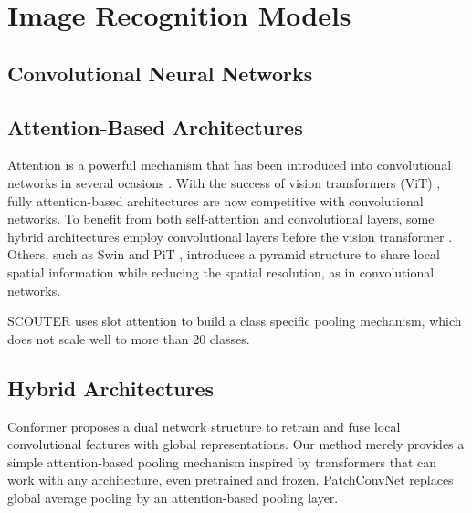 \section*{Image Recognition Models}
\label{rel:sec_imrecon}

\subsection*{Convolutional Neural Networks}
\label{rel:sub_cnn}

\subsection*{Attention-Based Architectures}
\label{rel:sub_att}
Attention is a powerful mechanism that has been introduced into convolutional networks in several 
ocasions \autocite{bello2019attention, ramachandran2019stand, shen2020global}. With the success of 
vision transformers (ViT) \autocite{dosovitskiy2020image}, fully attention-based architectures are now 
competitive with convolutional networks. To benefit from both self-attention and convolutional 
layers, some hybrid architectures employ convolutional layers before the vision transformer 
\autocite{graham2021levit,xiao2021early}. Others, such as Swin \autocite{liu2021swin} and PiT 
\autocite{heo2021rethinking}, introduces a pyramid structure to share local spatial information 
while reducing the spatial resolution, as in convolutional networks. 

SCOUTER \autocite{li2021scouter} uses slot attention \autocite{locatello2020object} to build a class 
specific pooling mechanism, which does not scale well to more than 20 classes. 

\subsection*{Hybrid Architectures}
Conformer \autocite{peng2021conformer} proposes a dual network structure to retrain and fuse local 
convolutional features with global representations. Our method merely provides a simple 
attention-based pooling mechanism inspired by transformers that can work with any architecture, 
even pretrained and frozen. PatchConvNet \autocite{touvron2021augmenting} replaces global average pooling by an 
attention-based pooling layer.
\label{rel:sub_hybrid}